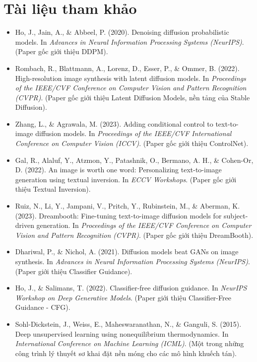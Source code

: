 \section*{Tài liệu tham khảo}
\begin{itemize}
	\item[1] Ho, J., Jain, A., \& Abbeel, P. (2020). Denoising diffusion probabilistic models. In \textit{Advances in Neural Information Processing Systems (NeurIPS)}. (Paper gốc giới thiệu DDPM).
	\item[2] Rombach, R., Blattmann, A., Lorenz, D., Esser, P., \& Ommer, B. (2022). High-resolution image synthesis with latent diffusion models. In \textit{Proceedings of the IEEE/CVF Conference on Computer Vision and Pattern Recognition (CVPR)}. (Paper gốc giới thiệu Latent Diffusion Models, nền tảng của Stable Diffusion).
	\item[3] Zhang, L., \& Agrawala, M. (2023). Adding conditional control to text-to-image diffusion models. In \textit{Proceedings of the IEEE/CVF International Conference on Computer Vision (ICCV)}. (Paper gốc giới thiệu ControlNet).
	\item[4] Gal, R., Alaluf, Y., Atzmon, Y., Patashnik, O., Bermano, A. H., \& Cohen-Or, D. (2022). An image is worth one word: Personalizing text-to-image generation using textual inversion. In \textit{ECCV Workshops}. (Paper gốc giới thiệu Textual Inversion).
	\item[5] Ruiz, N., Li, Y., Jampani, V., Pritch, Y., Rubinstein, M., \& Aberman, K. (2023). Dreambooth: Fine-tuning text-to-image diffusion models for subject-driven generation. In \textit{Proceedings of the IEEE/CVF Conference on Computer Vision and Pattern Recognition (CVPR)}. (Paper gốc giới thiệu DreamBooth).
	\item[6] Dhariwal, P., \& Nichol, A. (2021). Diffusion models beat GANs on image synthesis. In \textit{Advances in Neural Information Processing Systems (NeurIPS)}. (Paper giới thiệu Classifier Guidance).
	\item[7] Ho, J., \& Salimans, T. (2022). Classifier-free diffusion guidance. In \textit{NeurIPS Workshop on Deep Generative Models}. (Paper giới thiệu Classifier-Free Guidance - CFG).
	\item[8] Sohl-Dickstein, J., Weiss, E., Maheswaranathan, N., \& Ganguli, S. (2015). Deep unsupervised learning using nonequilibrium thermodynamics. In \textit{International Conference on Machine Learning (ICML)}. (Một trong những công trình lý thuyết sơ khai đặt nền móng cho các mô hình khuếch tán).
\end{itemize}